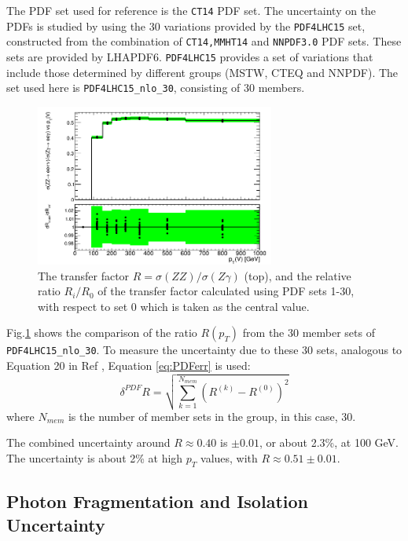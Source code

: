\documentclass[11pt,a4paper,openright,twoside]{report}
\begin{document}
The PDF set used for reference is the \texttt{CT14}\cite{CT14} PDF set. The uncertainty on the PDFs is studied by using the 30 variations provided by the \texttt{PDF4LHC15} set\cite{PDF4}, constructed from the combination of \texttt{CT14,MMHT14} and \texttt{NNPDF3.0} PDF sets. These sets are provided by LHAPDF6\cite{LHAPDF}. \texttt{PDF4LHC15} provides a set of variations that include those determined by different groups (MSTW, CTEQ and NNPDF). The set used here is \texttt{PDF4LHC15\_nlo\_30}, consisting of 30 members.
\begin{figure}[H]
\centering
	\includegraphics[width = 0.7\textwidth]{R_pdf.png}
	\caption{The transfer factor $R = \sigma(ZZ)/\sigma(Z\gamma)$ (top), and the relative ratio $R_i/R_0$ of the transfer factor  calculated using PDF sets 1-30, with respect to set 0 which is taken as the central value. }
	\label{fig:PDF30var}
\end{figure}
\noindent Fig.\ref{fig:PDF30var} shows the comparison of the ratio $R(p_T)$ from the 30 member sets of \texttt{PDF4LHC15\_nlo\_30}. To measure the uncertainty due to these 30 sets, analogous to Equation 20 in Ref \cite{PDF4}, Equation \ref{eq:PDFerr} is used:
\begin{equation}\label{eq:PDFerr}
	\delta^{PDF}R = \sqrt{\sum^{N_{mem}}_{k=1} (R^{(k)} - R^{(0)})^2}
\end{equation}
where $N_{mem}$ is the number of member sets in the group, in this case, 30.

\noindent The combined uncertainty around $R \approx 0.40$ is $\pm 0.01$, or about 2.3\%, at 100 GeV. The uncertainty is about 2\% at high $p_T$ values, with $R \approx 0.51 \pm 0.01$.

\subsection{Photon Fragmentation and Isolation Uncertainty}\label{subsec:photon_fragmentation}
\end{document}
